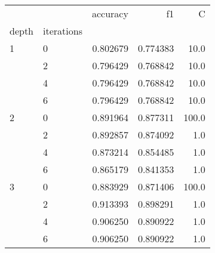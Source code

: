 \begin{tabular}{llrrr}
\toprule
  &   &  accuracy &        f1 &      C \\
depth & iterations &           &           &        \\
\midrule
1 & 0 &  0.802679 &  0.774383 &   10.0 \\
  & 2 &  0.796429 &  0.768842 &   10.0 \\
  & 4 &  0.796429 &  0.768842 &   10.0 \\
  & 6 &  0.796429 &  0.768842 &   10.0 \\
2 & 0 &  0.891964 &  0.877311 &  100.0 \\
  & 2 &  0.892857 &  0.874092 &    1.0 \\
  & 4 &  0.873214 &  0.854485 &    1.0 \\
  & 6 &  0.865179 &  0.841353 &    1.0 \\
3 & 0 &  0.883929 &  0.871406 &  100.0 \\
  & 2 &  0.913393 &  0.898291 &    1.0 \\
  & 4 &  0.906250 &  0.890922 &    1.0 \\
  & 6 &  0.906250 &  0.890922 &    1.0 \\
\bottomrule
\end{tabular}
